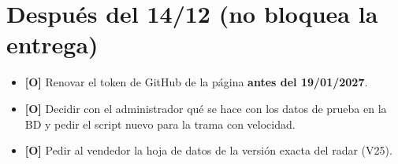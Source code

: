 \documentclass[11pt,a4paper]{article}
\newcommand{\opc}{\textcolor{gris}{\textbf{[O]}}}
\begin{document}
\section{Después del 14/12 (no bloquea la entrega)}
\begin{itemize}
  \item \opc{} Renovar el token de GitHub de la página \textbf{antes del 19/01/2027}.
  \item \opc{} Decidir con el administrador qué se hace con los datos de prueba en la BD y pedir
        el script nuevo para la trama con velocidad.
  \item \opc{} Pedir al vendedor la hoja de datos de la versión exacta del radar (V25).
\end{itemize}
\end{document}
